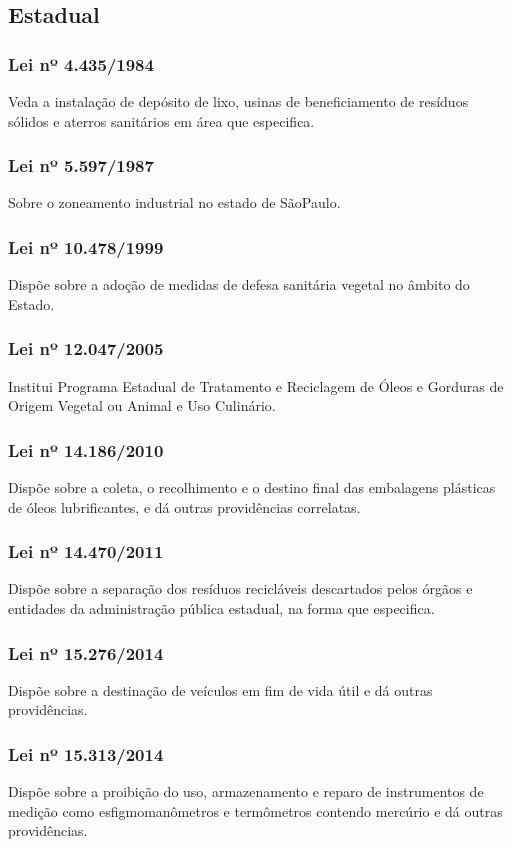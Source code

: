 \begin{subapend}
	\subsection{Estadual}
	\begin{subsubapend}
		\item \subsubsection{Lei nº 4.435/1984}
		Veda a instalação de depósito de lixo, usinas de beneficiamento de resíduos sólidos e aterros sanitários em área que especifica.
		\subsubsection{Lei nº 5.597/1987}
		Sobre o zoneamento industrial no estado de SãoPaulo.
		\subsubsection{Lei nº 10.478/1999}
		Dispõe sobre a adoção de medidas de defesa sanitária vegetal no âmbito do Estado.
		\subsubsection{Lei nº 12.047/2005}
		Institui Programa Estadual de Tratamento e Reciclagem de Óleos e Gorduras de Origem Vegetal ou Animal e Uso Culinário.
		\subsubsection{Lei nº 14.186/2010}
		Dispõe sobre a coleta, o recolhimento e o destino final das embalagens plásticas de óleos lubrificantes, e dá outras providências correlatas.
		\subsubsection{Lei nº 14.470/2011}
		Dispõe sobre a separação dos resíduos recicláveis descartados pelos órgãos e entidades da administração pública estadual, na forma que especifica.
		\subsubsection{Lei nº 15.276/2014}
		Dispõe sobre a destinação de veículos em fim de vida útil e dá outras providências.
		\subsubsection{Lei nº 15.313/2014}
		Dispõe sobre a proibição do uso, armazenamento e reparo de instrumentos de medição como esfigmomanômetros e termômetros contendo mercúrio e dá outras providências.

\end{subsubapend}
\end{subapend}
